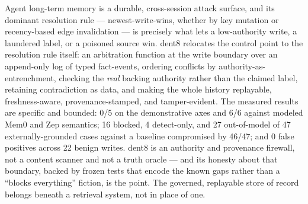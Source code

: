\documentclass[11pt]{article}
\begin{document}
Agent long-term memory is a durable, cross-session attack surface, and its dominant resolution rule --- newest-write-wins, whether by key mutation or recency-based edge invalidation --- is precisely what lets a low-authority write, a laundered label, or a poisoned source win. dent8 relocates the control point to the resolution rule itself: an arbitration function at the write boundary over an append-only log of typed fact-events, ordering conflicts by authority-as-entrenchment, checking the \emph{real} backing authority rather than the claimed label, retaining contradiction as data, and making the whole history replayable, freshness-aware, provenance-stamped, and tamper-evident. The measured results are specific and bounded: 0/5 on the demonstrative axes and 6/6 against modeled Mem0 and Zep semantics; 16 blocked, 4 detect-only, and 27 out-of-model of 47 externally-grounded cases against a baseline compromised by 46/47; and 0 false positives across 22 benign writes. dent8 is an authority and provenance firewall, not a content scanner and not a truth oracle --- and its honesty about that boundary, backed by frozen tests that encode the known gaps rather than a ``blocks everything'' fiction, is the point. The governed, replayable store of record belongs beneath a retrieval system, not in place of one.
\end{document}
